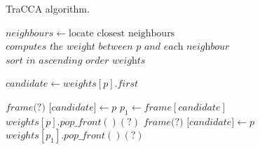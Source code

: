 \documentclass[conference]{IEEEtran}
\begin{document}
\begin{algorithm}
\caption{TraCCA algorithm.}
\label{alg:particlematch}

	\begin{algorithmic}[1]
		
			\State $neighbours \gets \text{locate closest neighbours } $
				\State $ \textit{computes the weight between p and each neighbour } $
				\State $ \textit{sort in ascending order weights}$
			
			\EndFor
		
		\EndFor
		\State $\textit{candidate} \gets weights[p].first$
		
		\State $\textit{frame(?) [candidate]} \gets p$
		\Else
		\State $p_1 \gets frame[candidate]$
		\State $weights[p].pop\_front() (?)$
		\Else
		\State $\textit{frame(?) [candidate]} \gets p$
		\State $weights[p_1].pop\_front() (?)$
		\EndIf
		\EndIf
		\EndIf
		\EndFor
		
		\Else
		
		\EndIf
		\EndFor
		\EndProcedure
	\end{algorithmic}

\end{algorithm}
\end{document}
